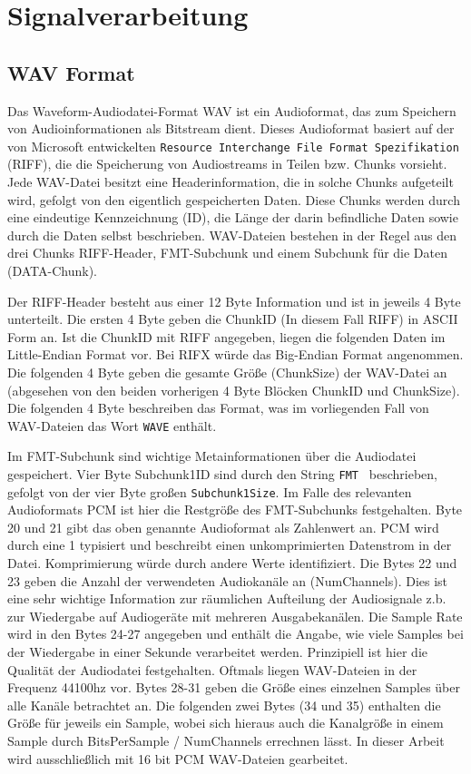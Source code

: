 
\section{Signalverarbeitung} \label{chap:signalprocessing}

\subsection{WAV Format \label{sub:WAV} \cite{brLibWav} \cite{Sapp}}
Das Waveform-Audiodatei-Format WAV ist ein Audioformat, das zum Speichern von Audioinformationen als Bitstream dient. Dieses Audioformat basiert auf der von Microsoft 
entwickelten \texttt{Resource Interchange File Format Spezifikation} (RIFF), die die Speicherung von Audiostreams in Teilen bzw. Chunks vorsieht. Jede WAV-Datei besitzt eine Headerinformation, die in solche Chunks aufgeteilt wird, gefolgt von den eigentlich gespeicherten Daten. Diese Chunks werden durch eine eindeutige Kennzeichnung (ID), die Länge der darin befindliche Daten sowie durch die Daten selbst beschrieben. WAV-Dateien bestehen in der Regel aus den drei Chunks RIFF-Header, FMT-Subchunk und einem Subchunk für die Daten (DATA-Chunk).

Der RIFF-Header besteht aus einer 12 Byte Information und ist in jeweils 4 Byte unterteilt. Die ersten 4 Byte geben die ChunkID (In diesem Fall RIFF) in ASCII Form an. Ist die ChunkID mit RIFF angegeben, liegen die folgenden Daten im Little-Endian Format vor. Bei RIFX würde das Big-Endian Format angenommen.
Die folgenden 4 Byte geben die gesamte Größe (ChunkSize) der WAV-Datei an (abgesehen von den beiden vorherigen 4 Byte Blöcken ChunkID und ChunkSize). Die folgenden 4 Byte beschreiben das Format, was im vorliegenden Fall von WAV-Dateien das Wort \texttt{WAVE} enthält.

Im FMT-Subchunk sind wichtige Metainformationen über die Audiodatei gespeichert. 
Vier Byte Subchunk1ID sind durch den String \texttt{FMT } beschrieben, gefolgt von der vier Byte großen \texttt{Subchunk1Size}. Im Falle des relevanten Audioformats PCM ist hier die Restgröße des FMT-Subchunks festgehalten. Byte 20 und 21 gibt das oben genannte Audioformat als Zahlenwert an. PCM wird durch eine 1 typisiert und beschreibt einen unkomprimierten Datenstrom in der Datei. Komprimierung würde durch andere Werte identifiziert. Die Bytes 22 und 23 geben die Anzahl der verwendeten Audiokanäle an (NumChannels). Dies ist eine sehr wichtige Information zur räumlichen Aufteilung der Audiosignale z.b. zur Wiedergabe auf Audiogeräte mit mehreren Ausgabekanälen. Die Sample Rate wird in den Bytes 24-27 angegeben und enthält die Angabe, wie viele Samples bei der Wiedergabe in einer Sekunde verarbeitet werden. Prinzipiell ist hier die Qualität der Audiodatei festgehalten. Oftmals liegen WAV-Dateien in der Frequenz 44100hz vor. Bytes 28-31 geben die Größe eines einzelnen Samples über alle Kanäle betrachtet an. Die folgenden zwei Bytes (34 und 35) enthalten die Größe für jeweils ein Sample, wobei sich hieraus auch die Kanalgröße in einem Sample durch BitsPerSample / NumChannels errechnen lässt. In dieser Arbeit wird ausschließlich mit 16 bit PCM WAV-Dateien gearbeitet.

